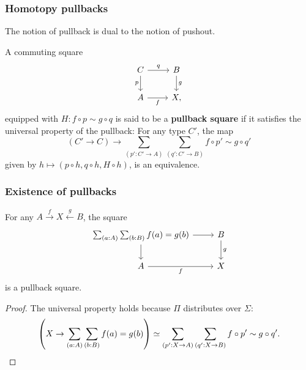 \documentclass[handout]{beamer}
\begin{document}
\begin{frame}
  \frametitle{Homotopy pullbacks}
  The notion of pullback is dual to the notion of pushout.
  \begin{definition}
    A commuting square
  \begin{equation*}
    \begin{tikzcd}[ampersand replacement=\&]
      C \arrow[d,swap,"p"] \arrow[r,"q"] \& B \arrow[d,"g"] \\
      A \arrow[r,swap,"f"] \& X,
    \end{tikzcd}
  \end{equation*}
  equipped with $H:f\circ p\sim g\circ q$ is said to be a \textbf{pullback square} if it satisfies the universal property of the pullback: For any type $C'$, the map
  \begin{equation*}
    (C'\to C)\to \sum_{(p':C'\to A)}\sum_{(q':C'\to B)}f\circ p'\sim g\circ q'
  \end{equation*}
  given by $h\mapsto (p\circ h,q\circ h,H\circ h)$, is an equivalence.
  \end{definition}
\end{frame}

\begin{frame}
  \frametitle{Existence of pullbacks}
  \begin{theorem}
    For any $A\stackrel{f}{\to} X \stackrel{g}{\leftarrow} B$, the square
    \begin{equation*}
      \begin{tikzcd}[ampersand replacement=\&]
        \sum_{(a:A)}\sum_{(b:B)}f(a)=g(b) \arrow[d] \arrow[r] \& B \arrow[d,"g"] \\
        A \arrow[r,swap,"f"] \& X
      \end{tikzcd}
    \end{equation*}
    is a pullback square.
  \end{theorem}

  \begin{proof}
    The universal property holds because $\Pi$ distributes over $\Sigma$:
    \begin{equation*}
      \left(X\to \sum_{(a:A)}\sum_{(b:B)}f(a)=g(b)\right)\simeq\sum_{(p':X\to A)}\sum_{(q':X\to B)}f\circ p'\sim g\circ q'.\qedhere
    \end{equation*}
  \end{proof}
\end{frame}
\end{document}
